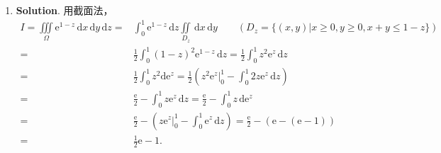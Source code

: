 \documentclass[../main.tex]{subfiles}
\begin{document}
\begin{enumerate}
    \item \textbf{Solution}. 用截面法，
          \[
              \begin{aligned}
                  I = \iiint\limits_{\Omega}\mathrm{e}^{1-z}\,\mathrm{d}x\,\mathrm{d}y\,\mathrm{d}z = {} & \int_{0}^{1}\mathrm{e}^{1-z}\,\mathrm{d}z\iint\limits_{D_z}\,\mathrm{d}x\,\mathrm{d}y \qquad \left(D_{z}=\{(x,y)|x\geq 0,y\geq 0,x+y\leq 1-z\}\right)                           \\
                  = {}                                                                                   & \frac{1}{2}\int_{0}^{1}(1-z)^{2}\mathrm{e}^{1-z}\,\mathrm{d}z = \frac{1}{2}\int_{0}^{1}z^{2}\mathrm{e}^{z}\,\mathrm{d}z                                                         \\
                  = {}                                                                                   & \frac{1}{2}\int_{0}^{1}z^{2} \mathrm{d}\mathrm{e}^{z}= \frac{1}{2}\left(z^{2}\mathrm{e}^{z}\Big|_{0}^{1}-\int_{0}^{1}2z\mathrm{e}^{z}\,\mathrm{d}z\right)                       \\
                  = {}                                                                                   & \frac{\mathrm{e}}{2}-\int_{0}^{1}z\mathrm{e}^{z}\,\mathrm{d}z = \frac{\mathrm{e}}{2}-\int_{0}^{1}z\,\mathrm{d}\mathrm{e}^{z}                                                    \\
                  = {}                                                                                   & \frac{\mathrm{e}}{2}-\left(z\mathrm{e}^{z}\Big|_{0}^{1}-\int_{0}^{1}\mathrm{e}^{z}\,\mathrm{d}z\right) = \frac{\mathrm{e}}{2}-\left(\mathrm{e}-\left(\mathrm{e}-1\right)\right) \\
                  = {}                                                                                   & \frac{1}{2}\mathrm{e}-1.
              \end{aligned}
          \]

\end{enumerate}
\end{document}
